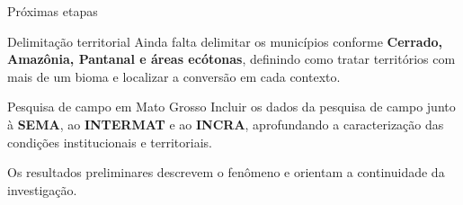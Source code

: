 \documentclass[aspectratio=169,11pt]{beamer}
\begin{document}
\begin{frame}{Próximas etapas}
\begin{block}{Delimitação territorial}
Ainda falta delimitar os municípios conforme \textbf{Cerrado, Amazônia, Pantanal e áreas ecótonas}, definindo como tratar territórios com mais de um bioma e localizar a conversão em cada contexto.
\end{block}
\medskip
\begin{block}{Pesquisa de campo em Mato Grosso}
Incluir os dados da pesquisa de campo junto à \textbf{SEMA}, ao \textbf{INTERMAT} e ao \textbf{INCRA}, aprofundando a caracterização das condições institucionais e territoriais.
\end{block}
\medskip
\centering\textcolor{verde}{Os resultados preliminares descrevem o fenômeno e orientam a continuidade da investigação.}
\end{frame}
\end{document}
